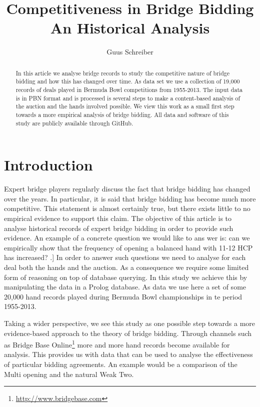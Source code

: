 \documentclass{llncs}
\title{Competitiveness in Bridge Bidding \\ An Historical Analysis}
\author{Guus Schreiber}
\institute{VU University Amsterdam, Computer Science \\
                E-mail: \instance{guus.schreiber@vu.nl}}
\begin{document}
\maketitle

\begin{abstract}
In this article we analyse bridge records to study the competitive
nature of bridge bidding and how this has changed over time. 
As data set we use
a collection of 19,000 records of deals played in Bermuda Bowl
competitions from 1955-2013.  The input data is in PBN format and is
processed is several steps to make a content-based analysis of the
auction and the hands involved possible.  We view this work as a
small first step towards a more empirical analysis of bridge bidding.
All data and software of this study are publicly available through
GitHub. 
\end{abstract}

\section{Introduction}

Expert bridge players regularly discuss the fact that bridge bidding has
changed over the years. In particular, it is said that bridge bidding has
become much more competitive. This statement is almost certainly true,
but there exists little to no empirical evidence
to support this claim. The objective of this article is to  analyse
historical records of expert bridge bidding in order to provide such
evidence. An example of a concrete question we would like to ans wer
is: can we empirically show that the frequency of opening a balanced
hand with 11-12 HCP has increased? .] In
order to answer such questions we need to analyse for each deal both
the hands and the auction. As a consequence we require some limited
form of reasoning on top of 
database querying.  In this study we achieve this by manipulating the
data in a Prolog database.  As data we use here a set of some
20,000  hand records played during Bermuda Bowl championships in te
period 1955-2013.  

Taking a wider perspective, we see this study as one possible step
towards  a more evidence-based approach to the theory of bridge
bidding. Through channels such as 
Bridge Base Online\footnote{\url{http://www.bridgebase.com}} more and
more hand records become available for analysis. This provides us with
data that can be used to analyse the effectiveness of particular bidding
agreements. An example would be a comparison of the Multi opening and
the natural Weak Two. 
\end{document}
